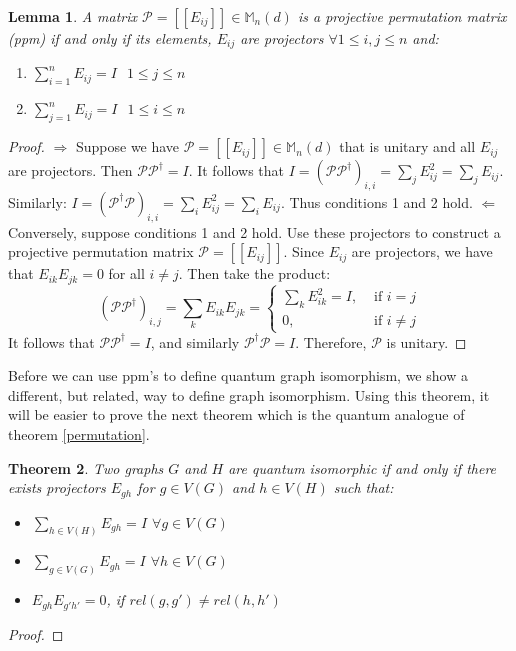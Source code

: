 \documentclass[12pt]{article}
\newtheorem{thm}{Theorem}[section]
\newtheorem{lem}[thm]{Lemma}
\begin{document}
\begin{lem}
A matrix $\mathcal{P} = [[E_{ij}]] \in \mathbb{M}_n(d)$ is a projective permutation matrix (ppm) if and only if its elements, $E_{ij}$ are projectors $\forall 1 \leq i, j \leq n$ and:
\begin{enumerate}
\item $\sum_{i=1}^n E_{ij} = I$ $ $ $1 \leq j \leq n$
\item $\sum_{j=1}^n E_{ij} = I$ $ $ $1 \leq i \leq n$
\end{enumerate}
\end{lem}
\begin{proof}
$\Rightarrow$ Suppose we have $\mathcal{P} = [[E_{ij}]] \in \mathbb{M}_n(d)$ that is unitary and all $E_{ij}$ are projectors. Then $\mathcal{P} \mathcal{P}^{\dag} = I$. It follows that $I = (\mathcal{P} \mathcal{P}^{\dag})_{i, i} = \sum_j E_{ij}^2 = \sum_j E_{ij}$. Similarly: $I = (\mathcal{P}^{\dag} \mathcal{P})_{i, i} = \sum_i E_{ij}^2 = \sum_i E_{ij}$. Thus conditions 1 and 2 hold.
$\Leftarrow$ Conversely, suppose conditions 1 and 2 hold. Use these projectors to construct a projective permutation matrix $\mathcal{P} = [[E_{ij}]]$. Since $E_{ij}$ are projectors, we have that $E_{ik}E_{jk} = 0$ for all $i \neq j$. Then take the product: 
\[ (\mathcal{P}\mathcal{P}^{\dag})_{i,j} = \sum_k E_{ik}E_{jk} = \begin{cases} 
\sum_k E_{ik}^2 = I, & \text{ if } i = j \\
0, & \text{ if } i \neq j  \end{cases}
\]
It follows that $\mathcal{P}\mathcal{P}^{\dag} = I$, and similarly $\mathcal{P}^{\dag} \mathcal{P} = I$. Therefore, $\mathcal{P}$ is unitary.
\end{proof}

Before we can use ppm's to define quantum graph isomorphism, we show a different, but related, way to define graph isomorphism. Using this theorem, it will be easier to prove the next theorem which is the quantum analogue of theorem \ref{permutation}.
\begin{thm}
Two graphs $G$ and $H$ are quantum isomorphic if and only if there exists projectors $E_{gh}$ for $g \in V(G)$ and $h \in V(H)$ such that:
\begin{itemize}
\item $\sum_{h \in V(H)} E_{gh} = I$  $\forall g \in V(G)$
\item $\sum_{g \in V(G)} E_{gh} = I$  $\forall h \in V(G)$
\item $E_{gh}E_{g'h'} = 0$, if $rel(g, g') \neq rel(h, h')$
\end{itemize}
\end{thm}
\begin{proof}

\end{proof}
\end{document}
